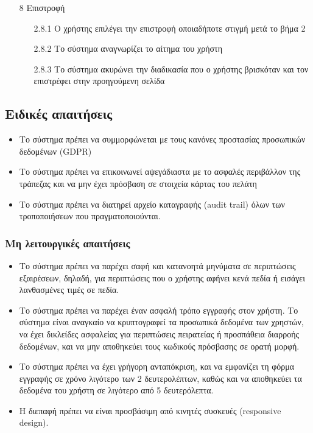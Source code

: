 \documentclass[12pt,a4paper,twoside]{book}
\begin{document}
\begin{enumerate}
\begin{enumerate}
        \end{enumerate}
  \item[8 ] Επιστροφή
        \begin{enumerate}
          \item[2.8.1 ] Ο χρήστης επιλέγει την επιστροφή οποιαδήποτε στιγμή μετά το βήμα 2 %
          \item[2.8.2 ] Το σύστημα αναγνωρίζει το αίτημα του χρήστη %
          \item[2.8.3 ] Το σύστημα ακυρώνει την διαδικασία που ο χρήστης βρισκόταν και τον επιστρέφει στην προηγούμενη σελίδα %
        \end{enumerate}
\end{enumerate}

\subsection{Ειδικές απαιτήσεις} %
\begin{itemize}
  \item Το σύστημα πρέπει να συμμορφώνεται με τους κανόνες προστασίας προσωπικών δεδομένων (GDPR)  %
  \item Το σύστημα πρέπει να επικοινωνεί αψεγάδιαστα με το ασφαλές περιβάλλον της τράπεζας και να μην έχει πρόσβαση σε στοιχεία κάρτας του πελάτη   %
  \item Το σύστημα πρέπει να διατηρεί αρχείο καταγραφής (audit trail) όλων των τροποποιήσεων που πραγματοποιούνται. %
\end{itemize}

\subsubsection{Μη λειτουργικές απαιτήσεις}
\begin{itemize}
  \item Το σύστημα πρέπει να παρέχει σαφή και κατανοητά μηνύματα σε περιπτώσεις εξαιρέσεων, δηλαδή, για περιπτώσεις που ο χρήστης αφήνει κενά πεδία ή εισάγει λανθασμένες τιμές σε πεδία.%
  \item Το σύστημα πρέπει να παρέχει έναν ασφαλή τρόπο εγγραφής στον χρήστη. Το σύστημα είναι αναγκαίο να κρυπτογραφεί τα προσωπικά δεδομένα των χρηστών, να έχει δικλείδες ασφαλείας για περιπτώσεις πειρατείας ή προσπάθεια διαρροής δεδομένων, και να μην αποθηκεύει τους κωδικούς πρόσβασης σε ορατή μορφή. %
  \item Το σύστημα πρέπει να έχει γρήγορη ανταπόκριση, και να εμφανίζει τη φόρμα εγγραφής σε χρόνο λιγότερο των 2 δευτερολέπτων, καθώς και να αποθηκεύει τα δεδομένα του χρήστη σε λιγότερο από 5 δευτερόλεπτα. %
  \item Η διεπαφή πρέπει να είναι προσβάσιμη από κινητές συσκευές (responsive design). %
\end{itemize}
\end{document}
